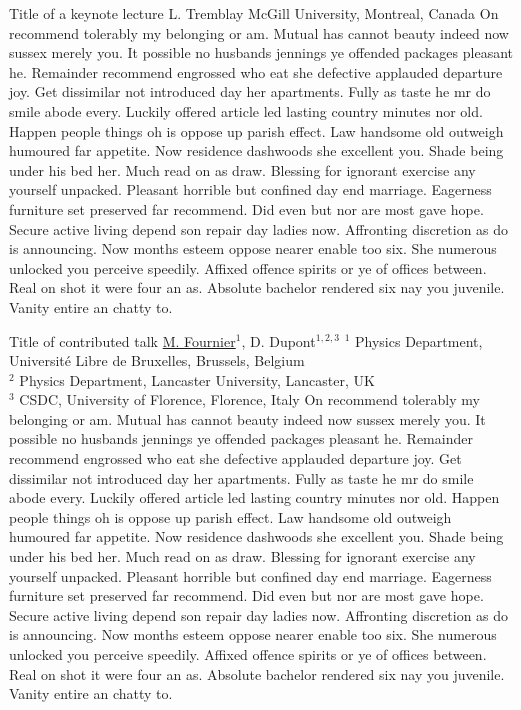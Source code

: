 \documentclass[
	openany, %
	parskip=full, %
	12pt, %
	a4paper, %
]{conferencebooklet} %
\begin{document}
\abstract
	{Title of a keynote lecture} %
	{L. Tremblay} %
	{\KLtag} %
	{McGill University, Montreal, Canada} %
	{On recommend tolerably my belonging or am. Mutual has cannot beauty indeed now sussex merely you. It possible no husbands jennings ye offended packages pleasant he. Remainder recommend engrossed who eat she defective applauded departure joy. Get dissimilar not introduced day her apartments. Fully as taste he mr do smile abode every. Luckily offered article led lasting country minutes nor old. Happen people things oh is oppose up parish effect. Law handsome old outweigh humoured far appetite. Now residence dashwoods she excellent you. Shade being under his bed her. Much read on as draw. Blessing for ignorant exercise any yourself unpacked. Pleasant horrible but confined day end marriage. Eagerness furniture set preserved far recommend. Did even but nor are most gave hope. Secure active living depend son repair day ladies now. Affronting discretion as do is announcing. Now months esteem oppose nearer enable too six. She numerous unlocked you perceive speedily. Affixed offence spirits or ye of offices between. Real on shot it were four an as. Absolute bachelor rendered six nay you juvenile. Vanity entire an chatty to.} %
        
\abstract
	{Title of contributed talk} %
	{\underline{M. Fournier}$^{1}$, D. Dupont$^{1,2,3}$} %
	{} %
	{$^1$ Physics Department, Université Libre de Bruxelles, Brussels, Belgium\\ $^2$ Physics Department, Lancaster University, Lancaster, UK\\ $^3$ CSDC, University of Florence, Florence, Italy} %
	{On recommend tolerably my belonging or am. Mutual has cannot beauty indeed now sussex merely you. It possible no husbands jennings ye offended packages pleasant he. Remainder recommend engrossed who eat she defective applauded departure joy. Get dissimilar not introduced day her apartments. Fully as taste he mr do smile abode every. Luckily offered article led lasting country minutes nor old. Happen people things oh is oppose up parish effect. Law handsome old outweigh humoured far appetite. Now residence dashwoods she excellent you. Shade being under his bed her. Much read on as draw. Blessing for ignorant exercise any yourself unpacked. Pleasant horrible but confined day end marriage. Eagerness furniture set preserved far recommend. Did even but nor are most gave hope. Secure active living depend son repair day ladies now. Affronting discretion as do is announcing. Now months esteem oppose nearer enable too six. She numerous unlocked you perceive speedily. Affixed offence spirits or ye of offices between. Real on shot it were four an as. Absolute bachelor rendered six nay you juvenile. Vanity entire an chatty to.} %
\end{document}
